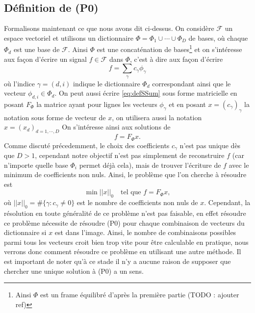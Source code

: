 \subsection{Définition de (P0)}
Formalisons maintenant ce que nous avons dit ci-dessus. 
On considère $\mathcal{F}$ un espace vectoriel et utilisons un dictionnaire $\Phi = \Phi_1 \cup \cdots \cup \Phi_D$ de bases, où chaque $\Phi_d$ est une base de $\mathcal{F}$. 
Ainsi $\Phi$ est une concaténation de bases\footnote{Ainsi $\Phi$ est un frame équilibré d'après la première partie (TODO : ajouter ref)} et on s'intéresse aux façon d'écrire un signal $f\in \mathcal{F}$ dans $\Phi$, c'est à dire aux façon d'écrire
\begin{equation}\label{eq:defSSum}
	f = \sum_\gamma c_\gamma \phi_\gamma
\end{equation}
où l'indice $\gamma = (d, i)$ indique le dictionnaire $\Phi_d$ correspondant ainsi que le vecteur $\phi_{d, i} \in \Phi_d$.
On peut aussi écrire \ref{eq:defSSum} sous forme matricielle en posant $F_\Phi$ la matrice ayant pour lignes les vecteurs $\phi_\gamma$ et en posant $x = (c_\gamma)_\gamma$ la notation sous forme de vecteur de $x$, on utilisera aussi la notation $x = (x_d)_{d=1, \cdots, D}$
On s'intéresse ainsi aux solutions de 
\begin{equation}
	f = F_\Phi x.
\end{equation}
Comme discuté précedemment, le choix des coefficients $c_\gamma$ n'est pas unique dès que $D>1$, cependant notre objectif n'est pas simplement de reconstruire $f$ (car n'importe quelle base $\Phi_i$ permet déjà cela), mais de trouver l'écriture de $f$ avec le minimum de coefficients non nuls.
Ainsi, le problème que l'on cherche à résoudre est 
\begin{equation}\label{P0}\tag{P0}
	\min ||x||_0\quad \text{tel que } f = F_\Phi x,
\end{equation}
où $||x||_0 = \#\{\gamma : c_\gamma \neq 0\}$ est le nombre de coefficients non nuls de $x$.
Cependant, la résolution en toute généralité de ce problème n'est pas faisable, en effet résoudre ce problème nécessite de résoudre (P0) pour chaque combinaison de vecteurs du dictionnaire si $x$ est dans l'image.
Ainsi, le nombre de combinaisons possibles parmi tous les vecteurs croit bien trop vite pour être calculable en pratique, nous verrons donc comment résoudre ce problème en utilisant une autre méthode.
\newline
Il est important de noter qu'à ce stade il n'y a aucune raison de supposer que chercher une unique solution à (P0) a un sens.
